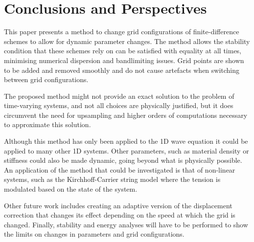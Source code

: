 \section{Conclusions and Perspectives}\label{sec:conclusion}
This paper presents a method to change grid configurations of finite-difference schemes to allow for dynamic parameter changes. The method allows the stability condition that these schemes rely on can be satisfied with equality at all times, minimising numerical dispersion and bandlimiting issues. Grid points are shown to be added and removed smoothly and do not cause artefacts when switching between grid configurations. 

The proposed method might not provide an exact solution to the problem of time-varying systems, and not all choices are physically justified, but it does circumvent the need for upsampling and higher orders of computations necessary to approximate this solution. %
%


Although this method has only been applied to the 1D wave equation it could be applied to many other 1D systems. Other parameters, such as material density or stiffness could also be made dynamic, going beyond what is physically possible. An application of the method that could be investigated is that of non-linear systems, such as the Kirchhoff-Carrier string model \cite{Carrier1945} where the tension is modulated based on the state of the system.

Other future work includes creating an adaptive version of the displacement correction that changes its effect depending on the speed at which the grid is changed. Finally, stability and energy analyses will have to be performed to show the limits on changes in parameters and grid  configurations.
